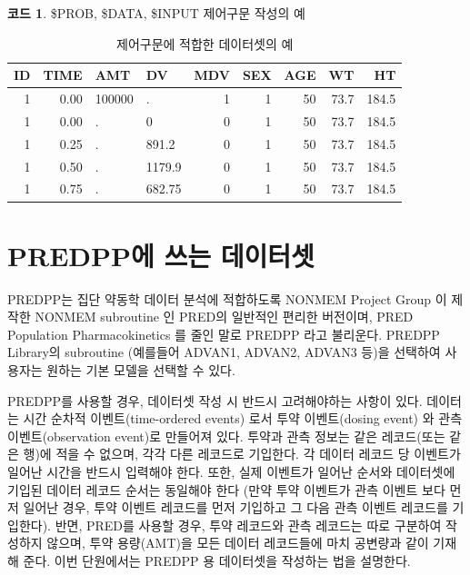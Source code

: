 \documentclass[
  10pt,
  krantz2,
  a4paper]{krantz}
\newenvironment{Shaded}{\begin{snugshade}}{\end{snugshade}}
\newcommand{\ErrorTok}[1]{\textcolor[rgb]{0.64,0.00,0.00}{\textbf{#1}}}
\newcommand{\NormalTok}[1]{#1}
\newcommand{\OperatorTok}[1]{\textcolor[rgb]{0.81,0.36,0.00}{\textbf{#1}}}
\theoremstyle{definition}
\theoremstyle{definition}
\newtheorem{example}{코드}[chapter]
\theoremstyle{definition}
\theoremstyle{remark}
\begin{document}
\begin{example}
\protect\hypertarget{exm:input}{}{\label{exm:input} }\$PROB, \$DATA, \$INPUT 제어구문 작성의 예
\end{example}

\begin{Shaded}
\end{Shaded}

\begin{table}

\caption{\label{tab:tab}제어구문에 적합한 데이터셋의 예}
\centering
\begin{tabular}[t]{rrllrrrrr}
\toprule
ID & TIME & AMT & DV & MDV & SEX & AGE & WT & HT\\
\midrule
1 & 0.00 & 100000 & . & 1 & 1 & 50 & 73.7 & 184.5\\
1 & 0.00 & . & 0 & 0 & 1 & 50 & 73.7 & 184.5\\
1 & 0.25 & . & 891.2 & 0 & 1 & 50 & 73.7 & 184.5\\
1 & 0.50 & . & 1179.9 & 0 & 1 & 50 & 73.7 & 184.5\\
1 & 0.75 & . & 682.75 & 0 & 1 & 50 & 73.7 & 184.5\\
\bottomrule
\end{tabular}
\end{table}

\hypertarget{predppuxc5d0-uxc4f0uxb294-uxb370uxc774uxd130uxc14b}{%
\section{PREDPP에 쓰는 데이터셋}\label{predppuxc5d0-uxc4f0uxb294-uxb370uxc774uxd130uxc14b}}

PREDPP는 집단 약동학 데이터 분석에 적합하도록 NONMEM Project Group 이 제작한 NONMEM subroutine 인 PRED의 일반적인 편리한 버전이며, PRED Population Pharmacokinetics 를 줄인 말로 PREDPP 라고 불리운다. PREDPP Library의 subroutine (예를들어 ADVAN1, ADVAN2, ADVAN3 등)을 선택하여 사용자는 원하는 기본 모델을 선택할 수 있다.

PREDPP를 사용할 경우, 데이터셋 작성 시 반드시 고려해야하는 사항이 있다. 데이터는 시간 순차적 이벤트(time-ordered events) 로서 투약 이벤트(dosing event) 와 관측 이벤트(observation event)로 만들어져 있다. 투약과 관측 정보는 같은 레코드(또는 같은 행)에 적을 수 없으며, 각각 다른 레코드로 기입한다. 각 데이터 레코드 당 이벤트가 일어난 시간을 반드시 입력해야 한다. 또한, 실제 이벤트가 일어난 순서와 데이터셋에 기입된 데이터 레코드 순서는 동일해야 한다 (만약 투약 이벤트가 관측 이벤트 보다 먼저 일어난 경우, 투약 이벤트 레코드를 먼저 기입하고 그 다음 관측 이벤트 레코드를 기입한다). 반면, PRED를 사용할 경우, 투약 레코드와 관측 레코드는 따로 구분하여 작성하지 않으며, 투약 용량(AMT)을 모든 데이터 레코드들에 마치 공변량과 같이 기재해 준다. 이번 단원에서는 PREDPP 용 데이터셋을 작성하는 법을 설명한다.
\end{document}
